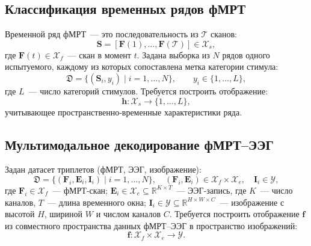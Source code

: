 \subsection{Классификация временных рядов фМРТ}\label{sec2:cls}
Временной ряд фМРТ~--- это последовательность из $\mathcal{T}$ сканов:
\begin{equation*}
\mathbf{S} = [\mathbf{F}(1), \ldots, \mathbf{F}(\mathcal{T})] \in \mathcal{X}_s,
\end{equation*}
где $\mathbf{F}(t) \in \mathcal{X}_f$~--- скан в момент $t$. Задана выборка из $N$ рядов одного испытуемого, каждому из которых сопоставлена метка категории стимула:
\begin{equation}\label{eq:cls_dataset}
\mathfrak{D} = \{(\mathbf{S}_i, y_i) \mid i = 1, \ldots, N\}, \qquad y_i \in \{1, \ldots, L\},
\end{equation}
где $L$~--- число категорий стимулов. Требуется построить отображение:
\begin{equation}\label{eq:cls_target}
\mathbf{h}: \mathcal{X}_s \to \{1, \ldots, L\},
\end{equation}
учитывающее пространственно-временные характеристики ряда.

\subsection{Мультимодальное декодирование фМРТ--ЭЭГ}\label{sec2:bimodal}

Задан датасет триплетов (фМРТ, ЭЭГ, изображение):
\begin{equation}\label{eq:dataset}
    \mathfrak{D} = \{(\mathbf{F}_i, \mathbf{E}_i, \mathbf{I}_i) \mid i = 1, \ldots, N \}, \quad (\mathbf{F}_i, \mathbf{E}_i) \in \mathcal{X}_f \times \mathcal{X}_e, \quad \mathbf{I}_i \in \mathcal{Y},
\end{equation}
где $\mathbf{F}_i \in \mathcal{X}_f$~--- фМРТ-скан; $\mathbf{E}_i \in \mathcal{X}_e \subseteq \mathbb{R}^{K \times T}$~--- ЭЭГ-запись, где $K$~--- число каналов, $T$~--- длина временного окна; $\mathbf{I}_i \in \mathcal{Y} \subseteq \mathbb{R}^{H \times W \times C}$~--- изображение с высотой $H$, шириной $W$ и числом каналов $C$. Требуется построить отображение $\mathbf{f}$ из совместного пространства данных фМРТ--ЭЭГ в пространство изображений:
\begin{equation}\label{eq:target}
    \mathbf{f}:  \mathcal{X}_f \times \mathcal{X}_e \rightarrow \mathcal{Y}.
\end{equation}